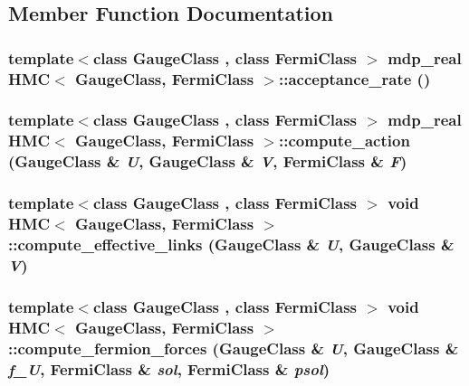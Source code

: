 \subsection{Member Function Documentation}
\hypertarget{class_h_m_c_a29d58281eca79c9fdc0f6160d4c61b53}{
\subsubsection[{acceptance\_\-rate}]{\setlength{\rightskip}{0pt plus 5cm}template$<$class GaugeClass , class FermiClass $>$ {\bf mdp\_\-real} {\bf HMC}$<$ GaugeClass, FermiClass $>$::acceptance\_\-rate ()}}
\label{class_h_m_c_a29d58281eca79c9fdc0f6160d4c61b53}
\hypertarget{class_h_m_c_a28b4077c0a378abdbc3a75b27b6ec66c}{
\subsubsection[{compute\_\-action}]{\setlength{\rightskip}{0pt plus 5cm}template$<$class GaugeClass , class FermiClass $>$ {\bf mdp\_\-real} {\bf HMC}$<$ GaugeClass, FermiClass $>$::compute\_\-action (GaugeClass \& {\em U}, \/  GaugeClass \& {\em V}, \/  FermiClass \& {\em F})}}
\label{class_h_m_c_a28b4077c0a378abdbc3a75b27b6ec66c}
\hypertarget{class_h_m_c_a4d455373ccf133c6a7bb59c13bc6db32}{
\subsubsection[{compute\_\-effective\_\-links}]{\setlength{\rightskip}{0pt plus 5cm}template$<$class GaugeClass , class FermiClass $>$ void {\bf HMC}$<$ GaugeClass, FermiClass $>$::compute\_\-effective\_\-links (GaugeClass \& {\em U}, \/  GaugeClass \& {\em V})}}
\label{class_h_m_c_a4d455373ccf133c6a7bb59c13bc6db32}
\hypertarget{class_h_m_c_a2e84b43878a9162a4370c6272f7db6ac}{
\subsubsection[{compute\_\-fermion\_\-forces}]{\setlength{\rightskip}{0pt plus 5cm}template$<$class GaugeClass , class FermiClass $>$ void {\bf HMC}$<$ GaugeClass, FermiClass $>$::compute\_\-fermion\_\-forces (GaugeClass \& {\em U}, \/  GaugeClass \& {\em f\_\-U}, \/  FermiClass \& {\em sol}, \/  FermiClass \& {\em psol})}}
